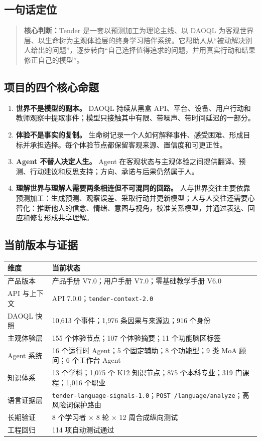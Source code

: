 \documentclass[UTF8,a4paper,11pt]{ctexart}
\newcommand{\keypoint}[1]{\begin{quote}\noindent\textbf{\color{TenderBlue}核心判断：}#1\end{quote}}
\begin{document}
\subsection{一句话定位}

\keypoint{Tender 是一套以预测加工为理论主线、以 DAOQL 为客观世界层、以生命树为主观体验层的终身学习陪伴系统。它帮助人从“被动解决别人给出的问题”，逐步转向“自己选择值得追求的问题，并用真实行动和结果修正自己的模型”。}

\subsection{项目的四个核心命题}

\begin{enumerate}
\item \textbf{世界不是模型的副本。} DAOQL 持续从黑盒 API、平台、设备、用户行动和教师观察中提取事件；模型只接触其中有限、带噪声、带时间延迟的一部分。
\item \textbf{体验不是事实的复制。} 生命树记录一个人如何解释事件、感受困难、形成目标并承担选择。每个体验节点都保留客观来源、置信度和可更正性。
\item \textbf{Agent 不替人决定人生。} Agent 在客观状态与主观体验之间提供翻译、预测、行动建议和反思支持；方向、承诺与后果仍然属于人。
\item \textbf{理解世界与理解人需要两条相连但不可混同的回路。} 人与世界交往主要依靠预测加工：生成预测、观察误差、采取行动并更新模型；人与人交往还需要心智化：推断他人的信念、情绪、意图与视角，校准关系模型，并通过表达、回应和修复形成共享理解。
\end{enumerate}

\subsection{当前版本与证据}

\begin{center}
\begin{tabularx}{\textwidth}{@{}p{4.6cm}X@{}}
\toprule
\textbf{维度} & \textbf{当前状态} \\
\midrule
产品版本 & 产品手册 V7.0；用户手册 V7.0；零基础教学手册 V6.0 \\
API 与上下文 & API 7.0.0；\texttt{tender-context-2.0} \\
DAOQL 快照 & 10,613 个事件；1,976 条因果与来源边；916 个身份 \\
主观体验层 & 155 个体验节点；107 个体验摘要；11 个功能脑区标签 \\
Agent 系统 & 16 个运行时 Agent；5 个固定辅助；8 个功能型；9 类 MoA 顾问；6 个工作台 Agent \\
知识体系 & 13 个学科；1,075 个 K12 知识节点；875 个本科专业；319 门课程；1,016 个职业 \\
语言证据层 & \texttt{tender-language-signals-1.0}；\texttt{POST /language/analyze}；高风险词保护路由 \\
长期验证 & 8 个学习者 × 8 轮 × 12 周合成纵向测试 \\
工程回归 & 114 项自动测试通过 \\
\bottomrule
\end{tabularx}
\end{center}
\end{document}
